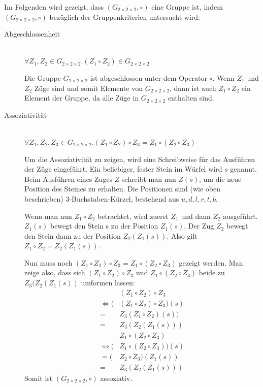 \documentclass[12pt,a4paper, usenames, dvipsnames]{article}
\newcommand{\Gtwo}{\ensuremath{G_{2\times 2\times 2}}}
\begin{document}
Im Folgenden wird gezeigt, dass $(\Gtwo, \circ)$ eine Gruppe ist, indem $(\Gtwo, \circ)$ bezüglich der Gruppenkriterien untersucht wird:
\begin{description}
\item [Abgeschlossenheit] \ \\
$\forall Z_1,Z_2 \in \Gtwo .  (Z_1 \circ Z_2) \in \Gtwo $ 


Die Gruppe $\Gtwo$ ist abgeschlossen unter dem Operator $\circ$. Wenn $Z_1 $ und $Z_2$ Züge sind und somit Elemente von $\Gtwo$, dann ist auch $Z_1 \circ Z_2$ ein Element der Gruppe, da alle Züge in $\Gtwo$ enthalten sind. 



\item [Assoziativität] \ \\
$\forall Z_1,Z_2,Z_3 \in \Gtwo.(Z_1 \circ Z_2) \circ Z_3 = Z_1 \circ (Z_2 \circ Z_3)$ 


Um die Assoziativität zu zeigen, wird eine Schreibweise für das Ausführen der Züge eingeführt. Ein beliebiger, fester Stein im Würfel wird $s$ genannt. Beim Ausführen eines Zuges $Z$ schreibt man nun $Z(s)$, um die neue Position des Steines zu erhalten. Die Positionen sind (wie oben beschrieben) 3-Buchstaben-Kürzel, bestehend aus $u, d, l, r, t, b$. 

Wenn man nun $Z_1 \circ Z_2 $ betrachtet, wird zuerst $Z_1$ und dann $Z_2$ ausgeführt. $Z_1(s)$ bewegt den Stein s zu der Position $Z_1(s)$. Der Zug $Z_2$ bewegt den Stein dann zu der Position $Z_2(Z_1(s))$. Also gilt $Z_1 \circ Z_2 = Z_2(Z_1(s))$. 


Nun muss noch $(Z_1 \circ Z_2) \circ Z_3 = Z_1 \circ (Z_2 \circ Z_3)$ gezeigt werden. Man zeige also, dass sich $(Z_1 \circ Z_2) \circ Z_3$ und $Z_1 \circ (Z_2 \circ Z_3)$ beide zu $Z_3(Z_2(Z_1(s))$ umformen lassen: 
\begin{align*}
& (Z_1 \circ Z_2) \circ Z_3  \\
\Leftrightarrow (&(Z_1 \circ Z_2) \circ Z_3)(s) \\
= & Z_3(Z_1 \circ Z_2)(s)) \\
= & Z_3(Z_2(Z_1(s)))  
\end{align*}
\begin{align*}
&Z_1 \circ (Z_2 \circ Z_3) \\
\Leftrightarrow (&Z_1 \circ (Z_2 \circ Z_3))(s) \\
= (&Z_2 \circ Z_3)(Z_1(s)) \\
= \ \ & Z_3(Z_2(Z_1(s)))  
\end{align*}
Somit ist $(\Gtwo, \circ)$ assoziativ.


\end{description}
\end{document}
